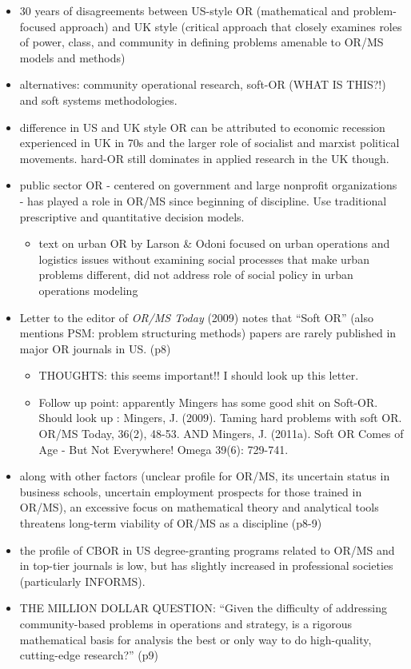 \documentclass{article}
\begin{document}
\begin{itemize}
\item 30 years of disagreements between US-style OR (mathematical and problem-focused approach) and UK style (critical approach that closely examines roles of power, class, and community in defining problems amenable to OR/MS models and methods)
\item alternatives: community operational research, soft-OR (WHAT IS THIS?!) and soft systems methodologies.
\item difference in US and UK style OR can be attributed to economic recession experienced in UK in 70s and the larger role of socialist and marxist political movements. hard-OR still dominates in applied research in the UK though.
\item public sector OR - centered on government and large nonprofit organizations - has played a role in OR/MS since beginning of discipline. Use traditional prescriptive and quantitative decision models.
	\begin{itemize}
	\item text on urban OR by Larson \& Odoni focused on urban operations and logistics issues without examining social processes that make urban problems different, did not address role of social policy in urban operations modeling
	\end{itemize}
\item Letter to the editor of \textit{OR/MS Today} (2009) notes that ``Soft OR'' (also mentions PSM: problem structuring methods) papers are rarely published in major OR journals in US. (p8)
	\begin{itemize}
	\item THOUGHTS: this seems important!! I should look up this letter.
    \item Follow up point: apparently Mingers  has some good shit on Soft-OR. Should look up : Mingers, J. (2009). Taming hard problems with soft OR. OR/MS Today, 36(2), 48-53. AND \newline 
    Mingers, J. (2011a). Soft OR Comes of Age - But Not Everywhere! Omega 39(6): 729-741.
	\end{itemize}
\item along with other factors (unclear profile for OR/MS, its uncertain status in business schools, uncertain employment prospects for those trained in OR/MS), an excessive focus on mathematical theory and analytical tools threatens long-term viability of OR/MS as a discipline (p8-9)
\item the profile of CBOR in US degree-granting programs related to OR/MS and in top-tier journals is low, but has slightly increased in professional societies (particularly INFORMS).
\item THE MILLION DOLLAR QUESTION: ``Given the difficulty of addressing community-based problems in operations and strategy, is a rigorous mathematical basis for analysis the best or only way to do high-quality, cutting-edge research?'' (p9)
\end{itemize}
\end{document}
